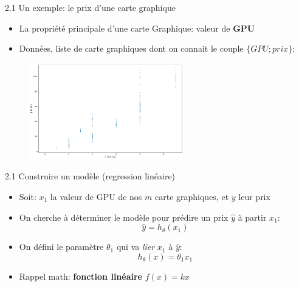 \begin{frame}{2.1 Un exemple: le prix d'une carte graphique}
  \begin{itemize}
  \item La propriété principale d'une carte Graphique: valeur de \textbf{GPU}
    \vspace{0.2cm}
  \item Données, liste de carte graphiques dont on connait le couple $\{GPU;prix\}$:
  \end{itemize}

  \begin{figure}
    \includegraphics[width=0.6\textwidth]{figs/gpuPrices.png}    
  \end{figure}
\end{frame}

\begin{frame}{2.1 Construire un modèle (regression linéaire)}
  \begin{itemize}
  \item Soit: $x_{1}$ la valeur de GPU de nos $m$ carte graphiques, et $y$ leur prix
    \vspace{0.2cm}
  \item On cherche à déterminer le modèle pour prédire un prix $\hat{y}$ à partir $x_{1}$:
    \begin{equation*}
      \hat{y} = h_{\theta}(x_{1})
    \end{equation*}
  \item On défini le paramètre $\theta_{1}$ qui va \textit{lier} $x_{1}$ à $\hat{y}$:
    \begin{equation*}
      h_{\theta}(x) = \theta_{1} x_{1}
    \end{equation*}
  \item Rappel math: \textbf{fonction linéaire} $f(x) = kx$
  \end{itemize}
\end{frame}

